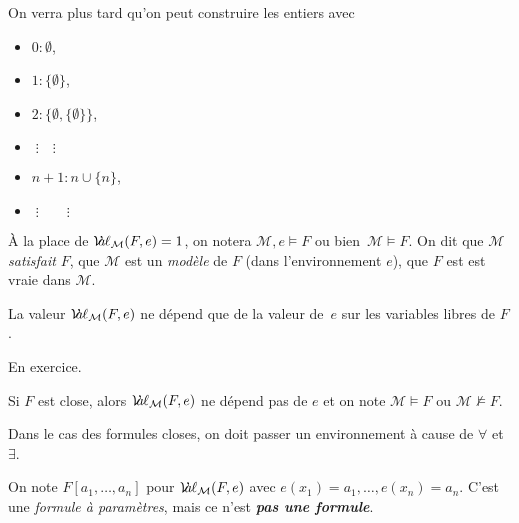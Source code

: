 \documentclass[./main]{subfiles}
\begin{document}
  \begin{rmk}
    On verra plus tard qu'on peut construire les entiers avec 
    \begin{itemize}
      \item $0 : \emptyset$,
      \item $1 : \{\emptyset\}$,
      \item $2 : \{\emptyset, \{\emptyset\}\}$,
      \item $\;\vdots \quad \vdots$
      \item  $n + 1 : n \cup \{n\}$,
      \item $\;\vdots \qquad \vdots$
    \end{itemize}
  \end{rmk}

  \begin{nota}
    À la place de $\mathcal{V}\hspace{-3.5pt}a\hspace{-0.5pt}\ell_\mathcal{M}(F, e) = 1$, on notera $\mathcal{M}, e \models F$ ou bien~$\mathcal{M} \models F$.
    On dit que $\mathcal{M}$ \textit{satisfait} $F$, que $\mathcal{M}$ est un \textit{modèle} de $F$ (dans l'environnement $e$), que $F$ est est vraie dans $\mathcal{M}$.
  \end{nota}

  \begin{lem}
    La valeur $\mathcal{V}\hspace{-3.5pt}a\hspace{-0.5pt}\ell_\mathcal{M}(F, e)$ ne dépend que de la valeur de~$e$ sur les variables libres de $F$.
  \end{lem}
  \begin{prv}
    En exercice.
  \end{prv}

  \begin{crlr}
    Si $F$ est close, alors $\mathcal{V}\hspace{-3.5pt}a\hspace{-0.5pt}\ell_\mathcal{M}(F, e)$ ne dépend pas de $e$ et on note $\mathcal{M} \models F$ ou $\mathcal{M} \not\models F$.
  \end{crlr}

  \begin{rmk}
    Dans le cas des formules closes, on doit passer un environnement à cause de $\forall $ et $\exists $.
  \end{rmk}

  \begin{nota}
    On note $F[a_1, \ldots, a_n]$ pour $\mathcal{V}\hspace{-3.5pt}a\hspace{-0.5pt}\ell_\mathcal{M}(F, e)$ avec $e(x_1) = a_1, \ldots, e(x_n) = a_n$.
    C'est une \textit{formule à paramètres}, mais ce n'est \textit{\textbf{pas une formule}}.
  \end{nota}
\end{document}
